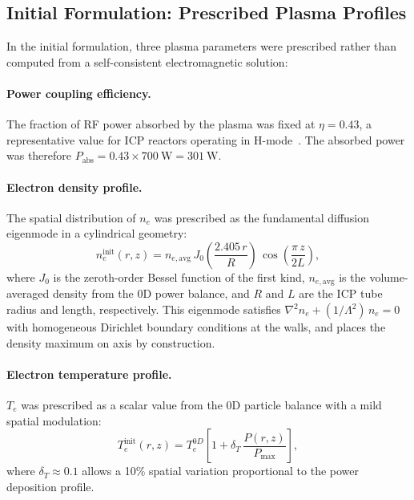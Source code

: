 \documentclass[11pt,a4paper]{report}
\newcommand{\Te}{T_e}
\begin{document}
\subsection{Initial Formulation: Prescribed Plasma Profiles}

In the initial formulation, three plasma parameters were prescribed rather than computed from a self-consistent electromagnetic solution:

\paragraph{Power coupling efficiency.}  The fraction of RF power absorbed by the plasma was fixed at $\eta = 0.43$, a representative value for ICP reactors operating in H-mode~\cite{Lieberman2005,Lee1995}.  The absorbed power was therefore $P_\mathrm{abs} = 0.43 \times \SI{700}{\watt} = \SI{301}{\watt}$.

\paragraph{Electron density profile.}  The spatial distribution of $n_e$ was prescribed as the fundamental diffusion eigenmode in a cylindrical geometry:
\begin{equation}
  \boxed{n_e^\mathrm{init}(r,z) = n_{e,\mathrm{avg}}\,J_0\!\left(\frac{2.405\,r}{R}\right)\,\cos\!\left(\frac{\pi\,z}{2L}\right),}
  \label{eq:ne-bessel}
\end{equation}
where $J_0$ is the zeroth-order Bessel function of the first kind, $n_{e,\mathrm{avg}}$ is the volume-averaged density from the 0D power balance, and $R$ and $L$ are the ICP tube radius and length, respectively.  This eigenmode satisfies $\nabla^2 n_e + (1/\Lambda^2)\,n_e = 0$ with homogeneous Dirichlet boundary conditions at the walls, and places the density maximum on axis by construction.

\paragraph{Electron temperature profile.}  $\Te$ was prescribed as a scalar value from the 0D particle balance with a mild spatial modulation:
\begin{equation}
  \Te^\mathrm{init}(r,z) = \Te^{0D}\!\left[1 + \delta_T\,\frac{P(r,z)}{P_\mathrm{max}}\right],
  \label{eq:Te-prescribed}
\end{equation}
where $\delta_T \approx 0.1$ allows a 10\% spatial variation proportional to the power deposition profile.
\end{document}
